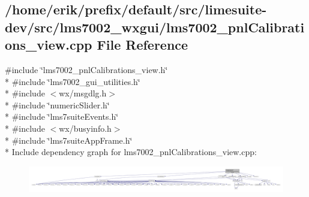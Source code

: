 \subsection{/home/erik/prefix/default/src/limesuite-\/dev/src/lms7002\+\_\+wxgui/lms7002\+\_\+pnl\+Calibrations\+\_\+view.cpp File Reference}
\label{lms7002__pnlCalibrations__view_8cpp}
{\ttfamily \#include \char`\"{}lms7002\+\_\+pnl\+Calibrations\+\_\+view.\+h\char`\"{}}\\*
{\ttfamily \#include \char`\"{}lms7002\+\_\+gui\+\_\+utilities.\+h\char`\"{}}\\*
{\ttfamily \#include $<$wx/msgdlg.\+h$>$}\\*
{\ttfamily \#include \char`\"{}numeric\+Slider.\+h\char`\"{}}\\*
{\ttfamily \#include \char`\"{}lms7suite\+Events.\+h\char`\"{}}\\*
{\ttfamily \#include $<$wx/busyinfo.\+h$>$}\\*
{\ttfamily \#include \char`\"{}lms7suite\+App\+Frame.\+h\char`\"{}}\\*
Include dependency graph for lms7002\+\_\+pnl\+Calibrations\+\_\+view.\+cpp\+:
\nopagebreak
\begin{figure}[H]
\begin{center}
\leavevmode
\includegraphics[width=350pt]{d8/dab/lms7002__pnlCalibrations__view_8cpp__incl}
\end{center}
\end{figure}
